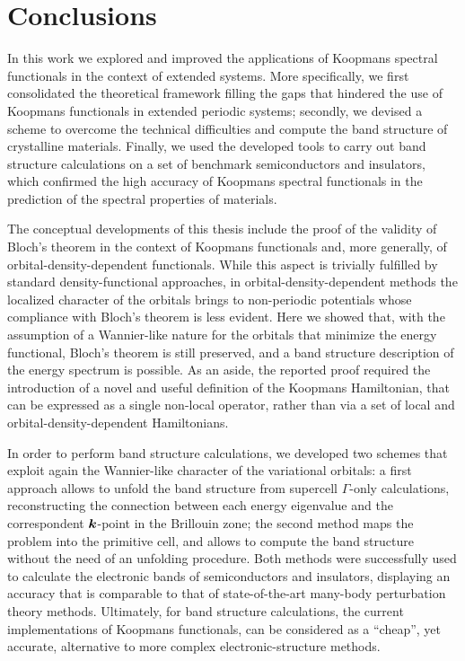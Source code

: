 \cleardoublepage
\chapter*{Conclusions}
\vspace{1cm}

In this work we explored and improved the applications of Koopmans spectral functionals in the context of extended systems. More specifically, we first consolidated the theoretical framework filling the gaps that hindered the use of Koopmans functionals in extended periodic systems; secondly, we devised a scheme to overcome the technical difficulties and compute the band structure of crystalline materials. Finally, we used the developed tools to carry out band structure calculations on a set of benchmark semiconductors and insulators, which confirmed the high accuracy of Koopmans spectral functionals in the prediction of the spectral properties of materials.

The conceptual developments of this thesis include the proof of the validity of Bloch's theorem in the context of Koopmans functionals and, more generally, of orbital-density-dependent functionals. While this aspect is trivially fulfilled by standard density-functional approaches, in orbital-density-dependent methods the localized character of the orbitals brings to non-periodic potentials whose compliance with Bloch's theorem is less evident. Here we showed that, with the assumption of a Wannier-like nature for the orbitals that minimize the energy functional, Bloch's theorem is still preserved, and a band structure description of the energy spectrum is possible. As an aside, the reported proof required the introduction of a novel and useful definition of the Koopmans Hamiltonian, that can be expressed as a single non-local operator, rather than via a set of local and orbital-density-dependent Hamiltonians.

In order to perform band structure calculations, we developed two schemes that exploit again the Wannier-like character of the variational orbitals: a first approach allows to unfold the band structure from supercell $\Gamma$-only calculations, reconstructing the connection between each energy eigenvalue and the correspondent ${\bm k}$-point in the Brillouin zone; the second method maps the problem into the primitive cell, and allows to compute the band structure without the need of an unfolding procedure. Both methods were successfully used to calculate the electronic bands of semiconductors and insulators, displaying an accuracy that is comparable to that of state-of-the-art many-body perturbation theory methods. Ultimately, for band structure calculations, the current implementations of Koopmans functionals, can be considered as a ``cheap'', yet accurate, alternative to more complex electronic-structure methods.

